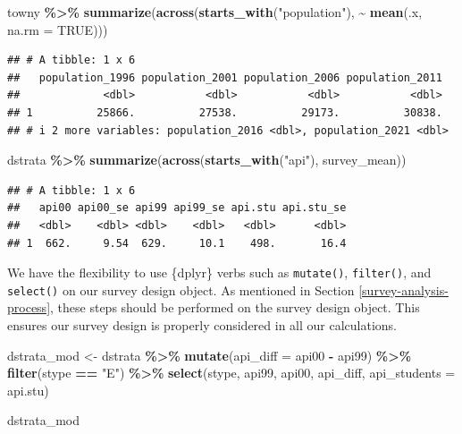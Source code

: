 \documentclass[
]{krantz}
\makeatletter
\newenvironment{Shaded}{\begin{snugshade}}{\end{snugshade}}
\newcommand{\AttributeTok}[1]{\textcolor[rgb]{0.27,0.27,0.27}{#1}}
\newcommand{\ConstantTok}[1]{\textcolor[rgb]{0.37,0.37,0.37}{#1}}
\newcommand{\FunctionTok}[1]{\textcolor[rgb]{0.27,0.27,0.27}{\textbf{#1}}}
\newcommand{\NormalTok}[1]{#1}
\newcommand{\OtherTok}[1]{\textcolor[rgb]{0.37,0.37,0.37}{#1}}
\newcommand{\SpecialCharTok}[1]{\textcolor[rgb]{0.43,0.43,0.43}{\textbf{#1}}}
\newcommand{\StringTok}[1]{\textcolor[rgb]{0.5,0.5,0.5}{#1}}
\newenvironment{kframe}{%
\medskip{}
\setlength{\fboxsep}{.8em}
 \def\at@end@of@kframe{}%
 \ifinner\ifhmode%
  \def\at@end@of@kframe{\end{minipage}}%
  \begin{minipage}{\columnwidth}%
 \fi\fi%
 \def\FrameCommand##1{\hskip\@totalleftmargin \hskip-\fboxsep
 \colorbox{shadecolor}{##1}\hskip-\fboxsep
     \hskip-\linewidth \hskip-\@totalleftmargin \hskip\columnwidth}%
 \MakeFramed {\advance\hsize-\width
   \@totalleftmargin\z@ \linewidth\hsize
   \@setminipage}}%
 {\par\unskip\endMakeFramed%
 \at@end@of@kframe}
\renewenvironment{Shaded}{\begin{kframe}}{\end{kframe}}
\makeatother
\begin{document}
\begin{Shaded}
\begin{Highlighting}[]
\NormalTok{towny }\SpecialCharTok{\%\textgreater{}\%}
  \FunctionTok{summarize}\NormalTok{(}\FunctionTok{across}\NormalTok{(}\FunctionTok{starts\_with}\NormalTok{(}\StringTok{"population"}\NormalTok{), }\SpecialCharTok{\textasciitilde{}} \FunctionTok{mean}\NormalTok{(.x, }\AttributeTok{na.rm =} \ConstantTok{TRUE}\NormalTok{)))}
\end{Highlighting}
\end{Shaded}

\begin{verbatim}
## # A tibble: 1 x 6
##   population_1996 population_2001 population_2006 population_2011
##             <dbl>           <dbl>           <dbl>           <dbl>
## 1          25866.          27538.          29173.          30838.
## # i 2 more variables: population_2016 <dbl>, population_2021 <dbl>
\end{verbatim}

\begin{Shaded}
\begin{Highlighting}[]
\NormalTok{dstrata }\SpecialCharTok{\%\textgreater{}\%}
  \FunctionTok{summarize}\NormalTok{(}\FunctionTok{across}\NormalTok{(}\FunctionTok{starts\_with}\NormalTok{(}\StringTok{"api"}\NormalTok{), survey\_mean))}
\end{Highlighting}
\end{Shaded}

\begin{verbatim}
## # A tibble: 1 x 6
##   api00 api00_se api99 api99_se api.stu api.stu_se
##   <dbl>    <dbl> <dbl>    <dbl>   <dbl>      <dbl>
## 1  662.     9.54  629.     10.1    498.       16.4
\end{verbatim}

We have the flexibility to use \{dplyr\} verbs such as \texttt{mutate()}, \texttt{filter()}, and \texttt{select()} on our survey design object. As mentioned in Section \ref{survey-analysis-process}, these steps should be performed on the survey design object. This ensures our survey design is properly considered in all our calculations.

\begin{Shaded}
\begin{Highlighting}[]
\NormalTok{dstrata\_mod }\OtherTok{\textless{}{-}}\NormalTok{ dstrata }\SpecialCharTok{\%\textgreater{}\%}
  \FunctionTok{mutate}\NormalTok{(}\AttributeTok{api\_diff =}\NormalTok{ api00 }\SpecialCharTok{{-}}\NormalTok{ api99) }\SpecialCharTok{\%\textgreater{}\%}
  \FunctionTok{filter}\NormalTok{(stype }\SpecialCharTok{==} \StringTok{"E"}\NormalTok{) }\SpecialCharTok{\%\textgreater{}\%}
  \FunctionTok{select}\NormalTok{(stype, api99, api00, api\_diff, }\AttributeTok{api\_students =}\NormalTok{ api.stu)}

\NormalTok{dstrata\_mod}
\end{Highlighting}
\end{Shaded}
\end{document}
